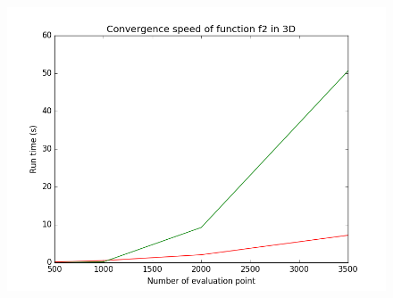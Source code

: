 \begin{figure}[h]
\begin{minipage}[b]{0.32\linewidth}
      \centering \includegraphics[scale=0.3]{images/f2_3d_s.png}
   \end{minipage}
\end{figure}
